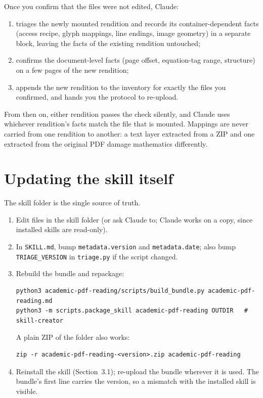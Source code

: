 \documentclass[11pt,a4paper]{article}
\newcommand{\file}[1]{\texttt{#1}}
\begin{document}
Once you confirm that the files were not edited, Claude:
\begin{enumerate}
  \item triages the newly mounted rendition and records its
  container-dependent facts (access recipe, glyph mappings, line endings,
  image geometry) in a separate block, leaving the facts of the existing
  rendition untouched;
  \item confirms the document-level facts (page offset, equation-tag range,
  structure) on a few pages of the new rendition;
  \item appends the new rendition to the inventory for exactly the files you
  confirmed, and hands you the protocol to re-upload.
\end{enumerate}
From then on, either rendition passes the check silently, and Claude uses
whichever rendition's facts match the file that is mounted. Mappings are
never carried from one rendition to another: a text layer extracted from a
ZIP and one extracted from the original PDF damage mathematics differently.

\section{Updating the skill itself}

The skill folder is the single source of truth.

\begin{enumerate}
  \item Edit files in the skill folder (or ask Claude to; Claude works on a
  copy, since installed skills are read-only).
  \item In \file{SKILL.md}, bump \texttt{metadata.version} and
  \texttt{metadata.date}; also bump \texttt{TRIAGE\_VERSION} in \file{triage.py} if
  the script changed.
  \item Rebuild the bundle and repackage:
\begin{lstlisting}
python3 academic-pdf-reading/scripts/build_bundle.py academic-pdf-reading.md
python3 -m scripts.package_skill academic-pdf-reading OUTDIR   # skill-creator
\end{lstlisting}
  A plain ZIP of the folder also works:
\begin{lstlisting}
zip -r academic-pdf-reading-<version>.zip academic-pdf-reading
\end{lstlisting}
  \item Reinstall the skill (Section~3.1); re-upload the bundle wherever it
  is used. The bundle's first line carries the version, so a mismatch with
  the installed skill is visible.
\end{enumerate}
\end{document}
